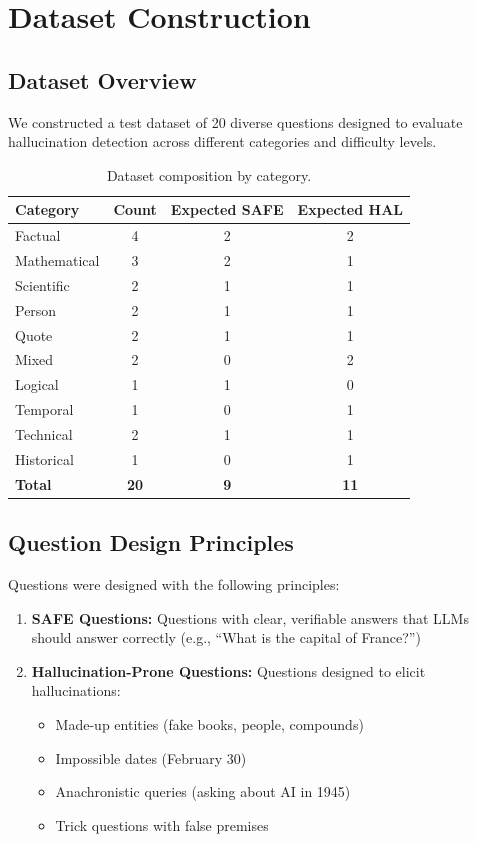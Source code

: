 \section{Dataset Construction}

\subsection{Dataset Overview}

We constructed a test dataset of 20 diverse questions designed to evaluate hallucination detection across different categories and difficulty levels.

\begin{table}[!htbp]
    \centering
    \caption{Dataset composition by category.}
    \label{tab:dataset}
    \begin{tabular}{lccc}
        \toprule
        Category & Count & Expected SAFE & Expected HAL \\
        \midrule
        Factual & 4 & 2 & 2 \\
        Mathematical & 3 & 2 & 1 \\
        Scientific & 2 & 1 & 1 \\
        Person & 2 & 1 & 1 \\
        Quote & 2 & 1 & 1 \\
        Mixed & 2 & 0 & 2 \\
        Logical & 1 & 1 & 0 \\
        Temporal & 1 & 0 & 1 \\
        Technical & 2 & 1 & 1 \\
        Historical & 1 & 0 & 1 \\
        \midrule
        \textbf{Total} & \textbf{20} & \textbf{9} & \textbf{11} \\
        \bottomrule
    \end{tabular}
\end{table}

\subsection{Question Design Principles}

Questions were designed with the following principles:

\begin{enumerate}
    \item \textbf{SAFE Questions:} Questions with clear, verifiable answers that LLMs should answer correctly (e.g., ``What is the capital of France?'')

    \item \textbf{Hallucination-Prone Questions:} Questions designed to elicit hallucinations:
    \begin{itemize}
        \item Made-up entities (fake books, people, compounds)
        \item Impossible dates (February 30)
        \item Anachronistic queries (asking about AI in 1945)
        \item Trick questions with false premises
    \end{itemize}
\end{enumerate}

